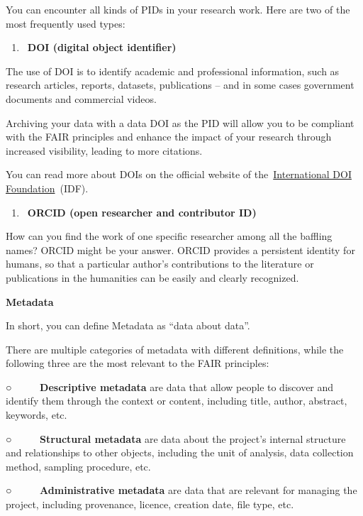 \documentclass[
]{book}
\providecommand{\tightlist}{%
  \setlength{\itemsep}{0pt}\setlength{\parskip}{0pt}}
\begin{document}
You can encounter all kinds of PIDs in your research work. Here are two of the most frequently used types:

\begin{enumerate}
\def\labelenumi{\arabic{enumi}.}
\tightlist
\item
  ~\textbf{DOI (digital object identifier)}
\end{enumerate}

The use of DOI is to identify academic and professional information, such as research articles, reports, datasets, publications -- and in some cases government documents and commercial videos.

Archiving your data with a data DOI as the PID will allow you to be compliant with the FAIR principles and enhance the impact of your research through increased visibility, leading to more citations.

You can read more about DOIs on the official website of the~\href{https://www.doi.org/}{}\href{https://www.doi.org/}{International DOI Foundation}~(IDF).

\begin{enumerate}
\def\labelenumi{\arabic{enumi}.}
\tightlist
\item
  ~\textbf{ORCID (open researcher and contributor ID)}
\end{enumerate}

How can you find the work of one specific researcher among all the baffling names? ORCID might be your answer. ORCID provides a persistent identity for humans, so that a particular author's contributions to the literature or publications in the humanities can be easily and clearly recognized.

\textbf{Metadata}

In short, you can define Metadata as ``data about data''.

There are multiple categories of metadata with different definitions, while the following three are the most relevant to the FAIR principles:

○ ~ ~ ~ \textbf{Descriptive metadata} are data that allow people to discover and identify them through the context or content, including title, author, abstract, keywords, etc.

○ ~ ~ ~ \textbf{Structural metadata} are data about the project's internal structure and relationships to other objects, including the unit of analysis, data collection method, sampling procedure, etc.

○ ~ ~ ~ \textbf{Administrative metadata} are data that are relevant for managing the project, including provenance, licence, creation date, file type, etc.
\end{document}
